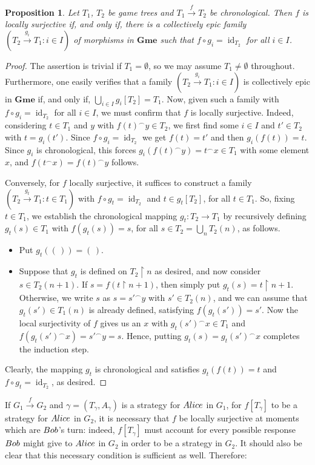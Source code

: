 \documentclass[12pt]{amsart}
\newtheorem{prop}[thm]{Proposition}
\theoremstyle{definition}
\newcommand{\seq}[1]{{\left( {#1} \right)}}
\newcommand{\ali}{\textup{\textmd{\textsc{Alice}}}}
\newcommand{\bob}{\textup{\textmd{\textsc{Bob}}}}
\DeclareMathOperator{\id}{id}
\DeclareMathOperator{\restrict}{\upharpoonright}
\newcommand{\Gmes}{\mathbf{Gme}}
\begin{document}
\begin{prop}
	Let $T_1$, $T_2$ be game trees and $T_1\stackrel{f}{\to}T_2$ be chronological. Then $f$ is locally surjective if, and only if, there is a collectively epic family $(T_2\stackrel{g_i}{\to}T_1:i\in I)$ of morphisms in $\Gmes$ such that $f\circ g_i = \id_{T_2}$ for all $i\in I$.
\end{prop}
\begin{proof}
	The assertion is trivial if $T_1=\emptyset$, so we may assume $T_1\neq \emptyset$ throughout. Furthermore, one easily verifies that a family $(T_2\stackrel{g_i}{\to}T_1:i\in I)$ is collectively epic in $\Gmes$ if, and only if, $\bigcup_{i\in I}g_i[T_2]=T_1$. Now, given such a family with $f\circ g_i = \id_{T_2}$ for all $i\in I$, we must confirm that $f$ is locally surjective. Indeed,
	considering $t\in T_1$ and $y$ with $f(t)^\smallfrown y\in T_2$, we first find some $i\in I$ and $t'\in T_2$ with $t=g_i(t')$. Since $f\circ g_i=\id_{T_2}$ we get $f(t)=t'$ and then $g_i(f(t))=t$. Since $g_i$ is chronological, this forces $g_i(f(t)^\smallfrown y)=t^\smallfrown x\in T_1$ with some element $x$, and  $f(t^\smallfrown x)=f(t)^\smallfrown y$ follows.
	
	Conversely, for $f$ locally surjective, it suffices to construct a family $(T_2\stackrel{g_t}{\to}T_1:t\in T_1)$ with $f\circ g_t=\id_{T_2}$ and $t\in g_t[T_2]$, for all $t\in T_1$. So, fixing $t\in T_1$, we establish the chronological mapping $g_t\colon T_2\to T_1$ by recursively defining $g_t(s)\in T_1$ with $f(g_t(s))=s$, for all $s\in T_2=\bigcup_{n} T_2(n)$, as follows.
	\begin{itemize}
		\item Put $g_t(\seq{\,})=\seq{\,}$.
		\item Suppose that $g_t$ is defined on $T_2\restrict n$ as desired, and now consider $s\in T_2(n+1)$. If $s=f(t\restrict n+1)$, then simply put $g_t(s)=t\restrict n+1$. Otherwise, we write $s$ as $s=s'^\smallfrown y$ with $s'\in T_2(n)$, and we can assume that $g_t(s')\in T_1(n)$ is already defined, satisfying $f(g_t(s'))=s'$. Now the local surjectivity of $f$ gives us an $x$ with $g_t(s')^\smallfrown x\in T_1$ and $f(g_t(s')^\smallfrown x)=s'^\smallfrown y=s$. Hence, putting $g_t(s)=g_t(s')^\smallfrown x$ completes the induction step.
	\end{itemize}
	Clearly, the mapping $g_t$ is chronological and satisfies $g_t(f(t))=t$ and $f\circ g_t=\id_{T_2}$, as desired.
\end{proof}


If $G_1\stackrel{f}{\to}G_2$ and $\gamma=(T_\gamma,A_\gamma)$ is a strategy for $\ali$ in $G_1$, for $f[T_\gamma]$ to be a strategy for $\ali$ in $G_2$, it is necessary that $f$ be locally surjective at moments which are $\bob$'s turn: indeed, $f[T_\gamma]$ must account for every possible response $\bob$ might give to $\ali$ in $G_2$ in order to be a strategy in $G_2$. It should also be clear that this necessary condition is sufficient as well. Therefore:
\end{document}

